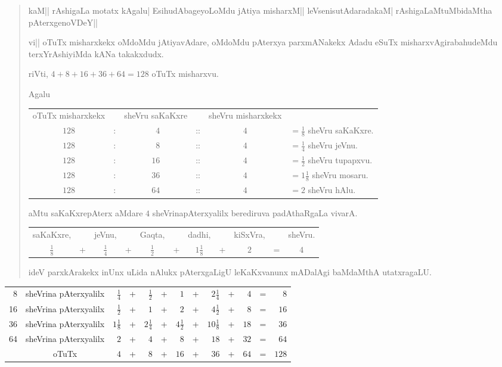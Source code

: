\begin{verse}
kaM|| rAshigaLa motatx kAgalu| EsihudAbageyoLoMdu jAtiya misharxM||
leVsenisutAdaradakaM| rAshigaLaMtuMbidaMtha pAterxgenoVDeY||

vi|| oTuTx misharxkekx oMdoMdu jAtiyavAdare, oMdoMdu pAterxya
parxmANakekx Adadu eSuTx misharxvAgirabahudeMdu terxYrAshiyiMda kANa
takakxdudx. 

riVti, $4+8+16+36+64=128$ oTuTx misharxvu.

Agalu
\begin{center}
\begin{tabular}{cccccl}
oTuTx misharxkekx && sheVru saKaKxre && sheVru misharxkekx & \\[3pt]
$128$ &:& ~$4$ &::& $4$ & $=\frac{1}{8}$ sheVru saKaKxre.\\[4pt]
$128$ &:& ~$8$ &::& $4$ & $=\frac{1}{4}$ sheVru jeVnu.\\[4pt]
$128$ &:& $16$ &::& $4$ & $=\frac{1}{2}$ sheVru tupapxvu.\\[4pt]
$128$ &:& $36$ &::& $4$ & $=1\frac{1}{8}$ sheVru mosaru.\\[4pt]
$128$ &:& $64$ &::& $4$ & $=2$ sheVru hAlu.\\[4pt]
\end{tabular}
\end{center}

aMtu saKaKxrepAterx aMdare $4$ sheVrinapAterxyalilx berediruva
padAthaRgaLa vivarA.
\begin{center}
\begin{tabular}{ccccccccccc}
saKaKxre, & & jeVnu, && Gaqta, && dadhi, && kiSxVra, && sheVru.\\[5pt]
$\frac{1}{8}$ & + & $\frac{1}{4}$ & + & $\frac{1}{2}$ & + &
$1\frac{1}{8}$ & + & $2$ & = & $4$
\end{tabular}
\end{center}
ideV parxkArakekx inUnx uLida nAlukx pAterxgaLigU leKaKxvanunx
mADalAgi baMdaMthA utatxragaLU.
\end{verse}
\begin{center}
\begin{tabular}{>{\rm}rcrcrcrcrcrcr}
8 & sheVrina pAterxyalilx & $\frac{1}{4}$ & + & $\frac{1}{2}$ & + & $1$ & +
& $2\frac{1}{4}$ & + & $4$ & = & $8$\\[5pt]
16 & sheVrina pAterxyalilx & $\frac{1}{2}$ & + & $1$ & + & $2$ & + &
$4\frac{1}{2}$ & + & $8$ & = & $16$\\[5pt]
36 & sheVrina pAterxyalilx & $1\frac{1}{8}$ & + & $2\frac{1}{4}$ & + &
$4\frac{1}{2}$ & + & $10\frac{1}{8}$ & + & $18$ & = & $36$\\[5pt]
64 & sheVrina pAterxyalilx & $2$ & + & $4$ & + & $8$ & + & $18$ & + & $32$ & = &
$64$\\[3pt]
\cline{2-13}
 & oTuTx & $4$ & + & $8$ & + & $16$ & + & $36$ & + & $64$ & = & $128$\\
\cline{2-13}
\end{tabular}
\end{center}



